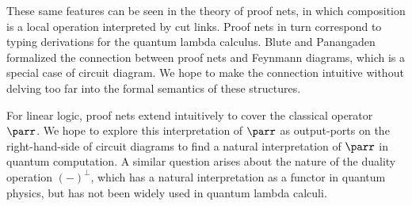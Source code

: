 \documentclass{article}
\begin{document}
These same features can be seen in the theory of proof nets, in which composition
is a local operation interpreted by cut links. Proof nets in turn correspond
to typing derivations for the quantum lambda calculus. Blute and
Panangaden~\cite{blute2011proof} formalized the connection between
proof nets and Feynmann diagrams, which is a special case of circuit diagram.
We hope to make the connection intuitive without delving too far into the formal semantics
of these structures.

For linear logic, proof nets extend intuitively to cover the classical operator $\parr$.
We hope to explore this interpretation of $\parr$ as output-ports on the right-hand-side 
of circuit diagrams to find a natural interpretation of $\parr$ in quantum computation.
A similar question arises about the nature of the duality operation $(-)^\bot$,
which has a natural interpretation as a functor in quantum physics, but has not been
widely used in quantum lambda calculi.




\end{document}
